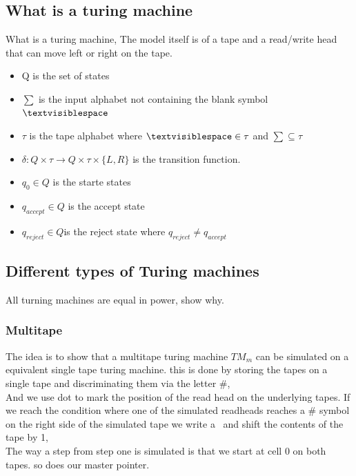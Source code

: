 \documentclass[a4paper,10pt,titlepage]{report}
\begin{document}
\subsection{What is a turing machine}
    What is a turing machine, The model itself is of a tape and a read/write head that can move left or right on the tape.\\
\begin{itemize}
\item Q is the set of states
\item $\sum$ is the input alphabet not containing the blank symbol $\textvisiblespace$
\item $\tau$ is the tape alphabet where  $\textvisiblespace \in \tau$ and $\sum \subseteq \tau $
\item  $\delta: Q \times \tau \rightarrow Q \times \tau \times \{L,R\} $ is the transition function.
\item $q_0 \in Q$ is the starte states
\item $q_{accept} \in Q$ is the accept state
\item $q_{reject} \in Q $is the reject state where $q_{reject} \neq q_{accept}$ 
\end{itemize}
    

\subsection{Different types of Turing machines}
All turning machines are equal in power, show why.
\subsubsection{Multitape}

The idea is to show that a multitape turing machine $TM_m$ can be simulated on a equivalent single tape turing machine. this is done by storing the tapes on a single tape and discriminating them via the letter $\#$, \\

And we use dot to mark the position of the read head on the underlying tapes. 
If we reach the condition where one of the simulated readheads reaches a $ \# $ symbol on the right side of the simulated tape we write a \textvisiblespace \ and shift the contents of the tape by 1,  \\

The way a step from step one is simulated is that we start at cell 0 on both tapes. so does our master pointer.\\
\end{document}
